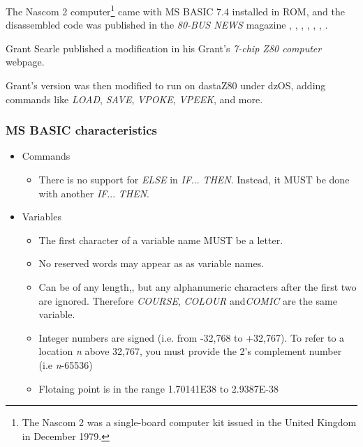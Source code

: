 \documentclass[a4paper,11pt]{article}
\begin{document}
    The Nascom 2 computer\footnote{The Nascom 2 was a single-board computer kit
    issued in the United Kingdom in December 1979.} came with MS BASIC 7.4
    installed in ROM, and the disassembled code was published in the
    \textit{80-BUS NEWS} magazine \cite{80busnews23}, \cite{80busnews24},
    \cite{80busnews25}, \cite{80busnews26}, \cite{80busnews31},
    \cite{80busnews32}, \cite{80busnews33}.

    Grant Searle published a modification in his Grant's \textit{7-chip Z80
    computer} webpage\cite{searle2}.

    Grant's version was then modified to run on dastaZ80 under dzOS, adding
    commands like \textit{LOAD}, \textit{SAVE}, \textit{VPOKE}, \textit{VPEEK},
    and more.

    \subsubsection{MS BASIC characteristics}

    \begin{itemize}
        \item Commands
        \begin{itemize}
            \item There is no support for \textit{ELSE} in \textit{IF}...
            \textit{THEN}. Instead, it MUST be done with another \textit{IF}...
            \textit{THEN}.
        \end{itemize}
        \item Variables
        \begin{itemize}
            \item The first character of a variable name MUST be a letter.
            \item No reserved words may appear as as variable names.
            \item Can be of any length,, but any alphanumeric characters after
            the first two are ignored. Therefore \textit{COURSE},
            \textit{COLOUR} and\textit{COMIC} are the same variable.
            \item Integer numbers are signed (i.e. from -32,768 to +32,767). To
            refer to a location \textit{n} above 32,767, you must provide the
            2's complement number (i.e \textit{n}-65536)
            \item Flotaing point is in the range 1.70141E38 to 2.9387E-38
        \end{itemize}
    \end{itemize}
\end{document}
